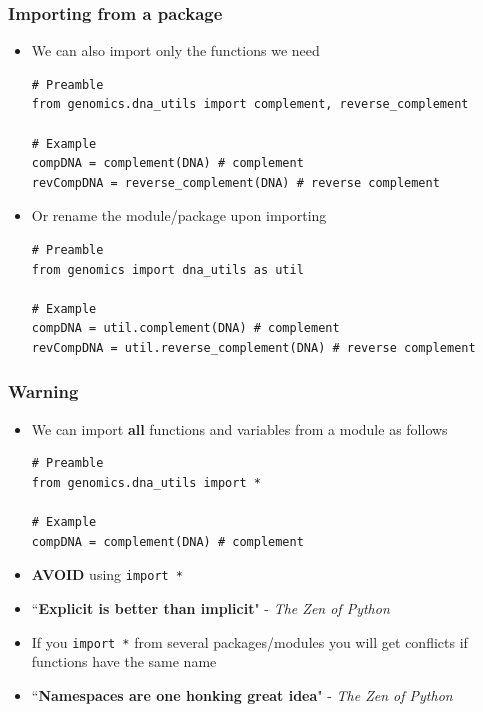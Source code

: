 \documentclass[xcolor=table]{beamer}
\begin{document}
\begin{frame}[fragile]
\frametitle{Importing from a package}

\begin{itemize}

\item<1-> We can also import only the functions we need
\begin{lstlisting}[style=python]
# Preamble
from genomics.dna_utils import complement, reverse_complement

# Example
compDNA = complement(DNA) # complement
revCompDNA = reverse_complement(DNA) # reverse complement
\end{lstlisting}

\item<2-> Or rename the module/package upon importing
\begin{lstlisting}[style=python]
# Preamble
from genomics import dna_utils as util

# Example
compDNA = util.complement(DNA) # complement
revCompDNA = util.reverse_complement(DNA) # reverse complement
\end{lstlisting}

\end{itemize}

\end{frame}

\begin{frame}[fragile]
\frametitle{Warning}

\begin{itemize}\addtolength{\itemsep}{0.8\baselineskip}

\item <1-> We can import \textbf{all} functions and variables from a module as follows
\begin{lstlisting}[style=python]
# Preamble
from genomics.dna_utils import *

# Example
compDNA = complement(DNA) # complement
\end{lstlisting}
\vspace{-0.7cm}
\item<2-> \textbf{AVOID} using \texttt{import *}

\item<3-> ``\textbf{Explicit is better than implicit}" - {\scriptsize \textit{The Zen of Python}}

\item<4-> If you \texttt{import *} from several packages/modules you will get conflicts
if functions have the same name 

\item<5-> ``\textbf{Namespaces are one honking great idea}" - {\scriptsize \textit{The Zen of Python}}

\end{itemize}

\end{frame}
\end{document}
